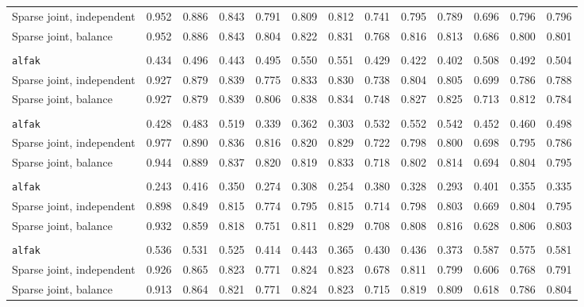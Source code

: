 \begin{center}
\begin{tabular}{l*{12}{r}}
\quad Sparse joint, independent & 0.952 & 0.886 & 0.843 & 0.791 & 0.809 & 0.812 & 0.741 & 0.795 & 0.789 & 0.696 & 0.796 & 0.796 \\
\quad Sparse joint, balance & 0.952 & 0.886 & 0.843 & 0.804 & 0.822 & 0.831 & 0.768 & 0.816 & 0.813 & 0.686 & 0.800 & 0.801 \\
\addlinespace[2pt]
\multicolumn{13}{l}{\textit{500/700, 1080 d}} \\
\quad \texttt{alfak} & 0.434 & 0.496 & 0.443 & 0.495 & 0.550 & 0.551 & 0.429 & 0.422 & 0.402 & 0.508 & 0.492 & 0.504 \\
\quad Sparse joint, independent & 0.927 & 0.879 & 0.839 & 0.775 & 0.833 & 0.830 & 0.738 & 0.804 & 0.805 & 0.699 & 0.786 & 0.788 \\
\quad Sparse joint, balance & 0.927 & 0.879 & 0.839 & 0.806 & 0.838 & 0.834 & 0.748 & 0.827 & 0.825 & 0.713 & 0.812 & 0.784 \\
\addlinespace[2pt]
\multicolumn{13}{l}{\textit{500/700, bottleneck}} \\
\quad \texttt{alfak} & 0.428 & 0.483 & 0.519 & 0.339 & 0.362 & 0.303 & 0.532 & 0.552 & 0.542 & 0.452 & 0.460 & 0.498 \\
\quad Sparse joint, independent & 0.977 & 0.890 & 0.836 & 0.816 & 0.820 & 0.829 & 0.722 & 0.798 & 0.800 & 0.698 & 0.795 & 0.786 \\
\quad Sparse joint, balance & 0.944 & 0.889 & 0.837 & 0.820 & 0.819 & 0.833 & 0.718 & 0.802 & 0.814 & 0.694 & 0.804 & 0.795 \\
\addlinespace[2pt]
\multicolumn{13}{l}{\textit{100/3000, 360 d}} \\
\quad \texttt{alfak} & 0.243 & 0.416 & 0.350 & 0.274 & 0.308 & 0.254 & 0.380 & 0.328 & 0.293 & 0.401 & 0.355 & 0.335 \\
\quad Sparse joint, independent & 0.898 & 0.849 & 0.815 & 0.774 & 0.795 & 0.815 & 0.714 & 0.798 & 0.803 & 0.669 & 0.804 & 0.795 \\
\quad Sparse joint, balance & 0.932 & 0.859 & 0.818 & 0.751 & 0.811 & 0.829 & 0.708 & 0.808 & 0.816 & 0.628 & 0.806 & 0.803 \\
\addlinespace[2pt]
\multicolumn{13}{l}{\textit{3000/100, 360 d}} \\
\quad \texttt{alfak} & 0.536 & 0.531 & 0.525 & 0.414 & 0.443 & 0.365 & 0.430 & 0.436 & 0.373 & 0.587 & 0.575 & 0.581 \\
\quad Sparse joint, independent & 0.926 & 0.865 & 0.823 & 0.771 & 0.824 & 0.823 & 0.678 & 0.811 & 0.799 & 0.606 & 0.768 & 0.791 \\
\quad Sparse joint, balance & 0.913 & 0.864 & 0.821 & 0.771 & 0.824 & 0.823 & 0.715 & 0.819 & 0.809 & 0.618 & 0.786 & 0.804 \\
\bottomrule
\end{tabular}
\end{center}

